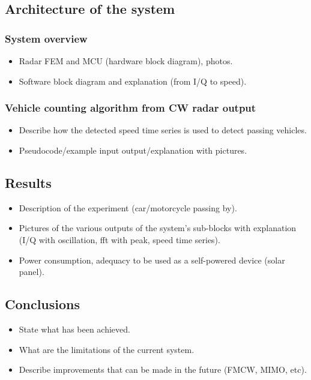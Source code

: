 \documentclass[12pt]{article}
\begin{document}
\subsection{Architecture of the system}

\subsubsection{System overview}

\begin{itemize}

\item Radar FEM and MCU (hardware block diagram), photos.

\item Software block diagram and explanation (from I/Q to speed).

\end{itemize}

\subsubsection{Vehicle counting algorithm from CW radar output}

\begin{itemize}

\item Describe how the detected speed time series is used to detect passing vehicles.

\item Pseudocode/example input output/explanation with pictures.

\end{itemize}

\subsection{Results}

\begin{itemize}

\item Description of the experiment (car/motorcycle passing by).

\item Pictures of the various outputs of the system's sub-blocks with explanation (I/Q with oscillation, fft with peak, speed time series).

\item Power consumption, adequacy to be used as a self-powered device (solar panel).

\end{itemize}

\subsection{Conclusions}

\begin{itemize}

\item State what has been achieved.

\item What are the limitations of the current system.

\item Describe improvements that can be made in the future (FMCW, MIMO, etc).

\end{itemize}
\end{document}
